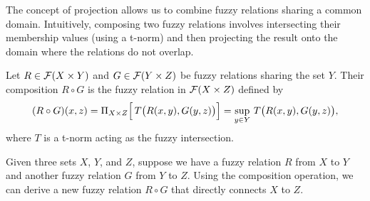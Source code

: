 

The concept of projection allows us to combine fuzzy relations sharing a common domain. Intuitively, composing two fuzzy relations involves intersecting their membership values (using a t-norm) and then projecting the result onto the domain where the relations do not overlap.

\begin{definition}
    Let \( R \in \mathcal{F}(X \times Y) \) and \( G \in \mathcal{F}(Y \times Z) \) be fuzzy relations sharing the set \(Y\). Their composition \( R \circ G \) is the fuzzy relation in \(\mathcal{F}(X \times Z)\) defined by
    \[
    (R \circ G)(x,z) = \Pi_{X\times Z}\Bigl[\, T\bigl(R(x,y), G(y,z)\bigr) \Bigr] = \sup_{y\in Y}\, T\bigl(R(x,y), G(y,z)\bigr),
    \]
    where \(T\) is a t-norm acting as the fuzzy intersection.
\end{definition}



Given three sets \(X\), \(Y\), and \(Z\), suppose we have a fuzzy relation \(R\) from \(X\) to \(Y\) and another fuzzy relation \(G\) from \(Y\) to \(Z\). Using the composition operation, we can derive a new fuzzy relation \(R \circ G\) that directly connects \(X\) to \(Z\).

